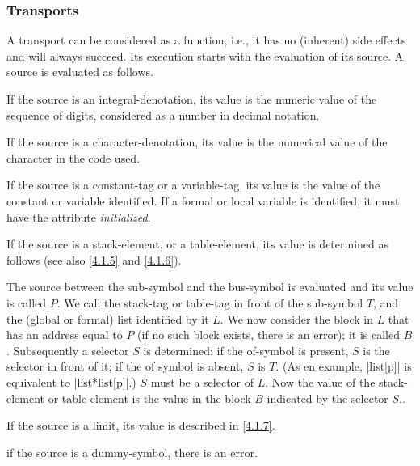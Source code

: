 \documentclass{article}
\newcommand\g[1]{{\sf #1}}
\begin{document}
\subsubsection{Transports}\label{3.4.1}
A \g{transport} can be considered as a \g{function}, i.e., it has no
(inherent) side effects and will always succeed.
Its execution starts with the evaluation of its \g{source}.
A \g{source} is evaluated as follows.
\begin{trivlist}
\item
If the \g{source} is an \g{integral-denotation}, its value is the numeric
value of the sequence of \g{digit}s, considered as a number in decimal
notation.
\item
If the \g{source} is a \g{character-denotation}, its value is the numerical
value of the \g{character} in the code used.
\item
If the \g{source} is a \g{constant-tag} or a \g{variable-tag}, its value is
the value of the constant or variable identified. If a
formal or local variable is identified, it must have the attribute \emph{initialized}.
\item
If the \g{source} is a \g{stack-element}, or a \g{table-element}, its value is determined as follows (see
also \ref{4.1.5} and \ref{4.1.6}).

The \g{source} between the \g{sub-symbol} and the
\g{bus-symbol} is evaluated and its value is called $P$. We call the
\g{stack-tag} or \g{table-tag} in front of the \g{sub-symbol} $T$, and the
(global or formal) list identified by it $L$.
We now consider the block in $L$ that has an address
equal to $P$ (if no such block exists, there is an error); it is called $B$.
Subsequently a selector $S$ is determined: if the \g{of-symbol} is present,
$S$ is the
\g{selector} in front of it; if the \g{of symbol} is absent, $S$ is $T$.
(As en example, \pp|list[p]| is equivalent to \pp|list*list[p]|.) $S$ must
be a selector of $L$.
Now the value of the
\g{stack-element} or \g{table-element} is the value in the block $B$ indicated by the selector
$S$..
\item
If the \g{source} is a \g{limit}, its value is described in \ref{4.1.7}.
\item if the \g{source} is a \g{dummy-symbol}, there is an error.
\end{trivlist}
\end{document}
